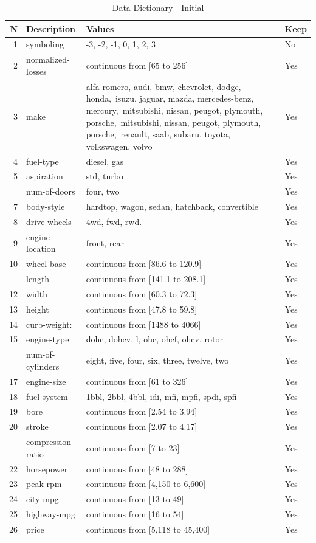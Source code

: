\documentclass[12pt,openany]{book}
\begin{document}
\begin{table}

\caption{\label{tab:data-dictionary}Data Dictionary - Initial}
\centering
\begin{tabular}[t]{rlll}
\toprule
N & Description & Values & Keep\\
\midrule
1 & symboling & -3, -2, -1, 0, 1, 2, 3 & No\\
2 & normalized-losses & continuous from [65 to 256] & Yes\\
3 & make & alfa-romero, audi, bmw, chevrolet, dodge, honda, isuzu, jaguar, mazda, mercedes-benz, mercury, mitsubishi, nissan, peugot, plymouth, porsche, mitsubishi, nissan, peugot, plymouth, porsche, renault, saab, subaru, toyota, volkswagen, volvo & Yes\\
4 & fuel-type & diesel, gas & Yes\\
5 & aspiration & std, turbo & Yes\\
\addlinespace
6 & num-of-doors & four, two & Yes\\
7 & body-style & hardtop, wagon, sedan, hatchback, convertible & Yes\\
8 & drive-wheels & 4wd, fwd, rwd. & Yes\\
9 & engine-location & front, rear & Yes\\
10 & wheel-base & continuous from [86.6 to 120.9] & Yes\\
\addlinespace
11 & length & continuous from [141.1 to 208.1] & Yes\\
12 & width & continuous from [60.3 to 72.3] & Yes\\
13 & height & continuous from [47.8 to 59.8] & Yes\\
14 & curb-weight: & continuous from [1488 to 4066] & Yes\\
15 & engine-type & dohc, dohcv, l, ohc, ohcf, ohcv, rotor & Yes\\
\addlinespace
16 & num-of-cylinders & eight, five, four, six, three, twelve, two & Yes\\
17 & engine-size & continuous from [61 to 326] & Yes\\
18 & fuel-system & 1bbl, 2bbl, 4bbl, idi, mfi, mpfi, spdi, spfi & Yes\\
19 & bore & continuous from [2.54 to 3.94] & Yes\\
20 & stroke & continuous from [2.07 to 4.17] & Yes\\
\addlinespace
21 & compression-ratio & continuous from [7 to 23] & Yes\\
22 & horsepower & continuous from [48 to 288] & Yes\\
23 & peak-rpm & continuous from [4,150 to 6,600] & Yes\\
24 & city-mpg & continuous from [13 to 49] & Yes\\
25 & highway-mpg & continuous from [16 to 54] & Yes\\
26 & price & continuous from [5,118 to 45,400] & Yes\\
\bottomrule
\end{tabular}
\end{table}
\end{document}
